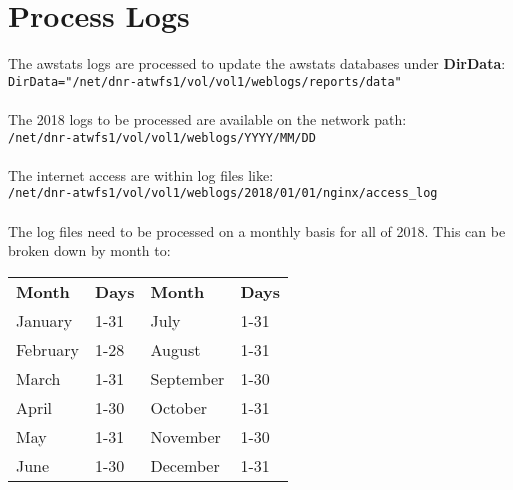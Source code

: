 
\newpage
\section{Process Logs}
The awstats logs are processed to update the awstats databases
under \textbf{DirData}:\\
\indent\texttt{DirData="/net/dnr-atwfs1/vol/vol1/weblogs/reports/data"}\\
\\
The 2018 logs to be processed are available on the network path:\\
\indent\texttt{/net/dnr-atwfs1/vol/vol1/weblogs/YYYY/MM/DD}\\
\\
The internet access are within log files like:\\
\indent\texttt{/net/dnr-atwfs1/vol/vol1/weblogs/2018/01/01/nginx/access\_log}\\
\\
The log files need to be processed on a monthly basis for all of
2018. This can be broken down by month to:
\\
\begin{center}
\begin{tabular}{l@{\hskip0.5in}l@{\hskip1.5in}l@{\hskip0.5in}l}
\bf{Month} & \bf{Days} & \bf{Month} & \bf{Days} \\
January    & 1-31      & July       & 1-31 \\
February   & 1-28      & August     & 1-31 \\
March      & 1-31      & September  & 1-30 \\
April      & 1-30      & October    & 1-31 \\
May        & 1-31      & November   & 1-30 \\
June       & 1-30      & December   & 1-31 \\
\end{tabular}
\end{center}


